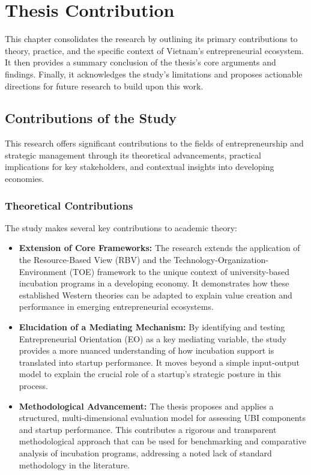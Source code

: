 \documentclass[../Main.tex]{subfiles}
\begin{document}
	\section{Thesis Contribution}
	
	This chapter consolidates the research by outlining its primary contributions to theory, practice, and the specific context of Vietnam's entrepreneurial ecosystem. It then provides a summary conclusion of the thesis's core arguments and findings. Finally, it acknowledges the study's limitations and proposes actionable directions for future research to build upon this work.
	
	\subsection{Contributions of the Study}
	
	This research offers significant contributions to the fields of entrepreneurship and strategic management through its theoretical advancements, practical implications for key stakeholders, and contextual insights into developing economies.
	
	\subsubsection{Theoretical Contributions}
	
	The study makes several key contributions to academic theory:
	
	\begin{itemize}
		\item \textbf{Extension of Core Frameworks:} The research extends the application of the Resource-Based View (RBV) and the Technology-Organization-Environment (TOE) framework to the unique context of university-based incubation programs in a developing economy. It demonstrates how these established Western theories can be adapted to explain value creation and performance in emerging entrepreneurial ecosystems.
		
		\item \textbf{Elucidation of a Mediating Mechanism:} By identifying and testing Entrepreneurial Orientation (EO) as a key mediating variable, the study provides a more nuanced understanding of how incubation support is translated into startup performance. It moves beyond a simple input-output model to explain the crucial role of a startup's strategic posture in this process.
		
		\item \textbf{Methodological Advancement:} The thesis proposes and applies a structured, multi-dimensional evaluation model for assessing UBI components and startup performance. This contributes a rigorous and transparent methodological approach that can be used for benchmarking and comparative analysis of incubation programs, addressing a noted lack of standard methodology in the literature.
	\end{itemize}
	
\end{document}
